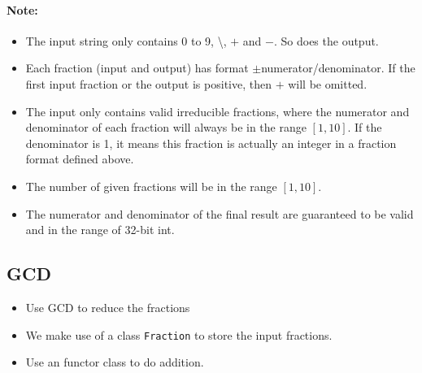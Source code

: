 \paragraph{Note:}
\begin{itemize}
\item The input string only contains 0 to 9, \textbackslash, $+$ and $-$. So does the output.
\item Each fraction (input and output) has format $\pm$numerator/denominator. If the first input fraction or the output is positive, then $+$ will be omitted.
\item The input only contains valid irreducible fractions, where the numerator and denominator of each fraction will always be in the range $[1,10]$. If the denominator is 1, it means this fraction is actually an integer in a fraction format defined above.
\item The number of given fractions will be in the range $[1,10]$.
\item The numerator and denominator of the final result are guaranteed to be valid and in the range of 32-bit int.
\end{itemize}

\subsection{GCD}
\begin{itemize}
\item Use GCD to reduce the fractions
\item We make use of a class \texttt{Fraction} to store the input fractions.
\item Use an functor class to do addition.
\end{itemize}

